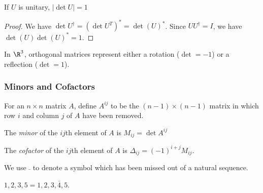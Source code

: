 \documentclass[a4paper]{article}
\begin{document}
\begin{cor}
  If $U$ is unitary, $|\det U| = 1$
\end{cor}

\begin{proof}
  We have $\det U^\dagger = (\det U^T)^* = \det(U)^*$. Since $UU^\dagger = I$, we have $\det(U)\det(U)^* = 1$.
\end{proof}

\begin{prop}
  In $\R^3$, orthogonal matrices represent either a rotation ($\det = -1$) or a reflection ($\det = 1$).
\end{prop}
\subsubsection{Minors and Cofactors}
\begin{defi}
  For an $n\times n$ matrix $A$, define $A^{ij}$ to be the $(n - 1)\times (n - 1)$ matrix in which row $i$ and column $j$ of $A$ have been removed.

  The \emph{minor} of the $ij$th element of $A$ is $M_{ij} = \det A^{ij}$

  The \emph{cofactor} of the $ij$th element of $A$ is $\Delta_{ij} = (-1)^{i + j}M_{ij}$.
\end{defi}

\begin{notation}
  We use $\bar \;$ to denote a symbol which has been missed out of a natural sequence.
\end{notation}
\begin{eg}
  $1, 2, 3, 5 = 1, 2, 3, \bar 4, 5$.

\end{eg}
\end{document}
